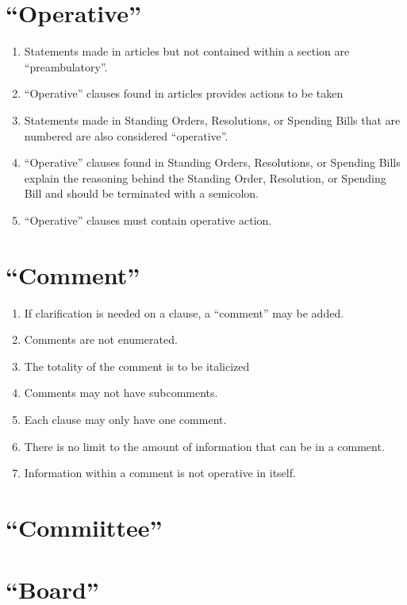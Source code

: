 \documentclass[12pt, letterpaper]{report}
\begin{document}
\begin{linenumbers}
        \section{``Operative''}
	    	\begin{enumerate}
            \renewcommand{\labelenumi}{\bfseries\alph{enumi})}
        	    \item Statements made in articles but not contained within a section are ``preambulatory''.
        	    \item ``Operative'' clauses found in articles provides actions to be taken
        	    \item Statements made in Standing Orders, Resolutions, or Spending Bills that are numbered are also considered ``operative''.
        	    \item ``Operative'' clauses found in Standing Orders, Resolutions, or Spending Bills explain the reasoning behind the Standing Order, Resolution, or Spending Bill and should be terminated with a semicolon.
        	    \item ``Operative'' clauses must contain operative action.
            \end{enumerate} 
        \section{``Comment''}
    	\begin{enumerate}
            \renewcommand{\labelenumi}{\bfseries\alph{enumi})}
        	    \item If clarification is needed on a clause, a ``comment'' may be added.
        	    \item Comments are not enumerated.
        	    \item The totality of the comment is to be italicized
        	    \item Comments may not have subcomments.
        	    \item Each clause may only have one comment.
        	    \item There is no limit to the amount of information that can be in a comment.
        	    \item Information within a comment is not operative in itself.
        	\end{enumerate}
        \section{``Commiittee''}
        \section{``Board''}

\end{linenumbers}
\end{document}
